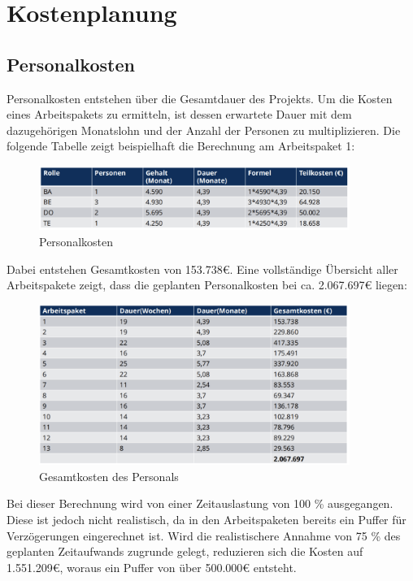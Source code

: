 \chapter{Kostenplanung}
\label{sec:kostenplanung}

\section{Personalkosten}
Personalkosten entstehen über die Gesamtdauer des Projekts. Um die Kosten eines Arbeitspakets zu ermitteln, ist dessen erwartete Dauer mit dem dazugehörigen Monatslohn und der Anzahl der Personen zu multiplizieren. Die folgende Tabelle zeigt beispielhaft die Berechnung am Arbeitspaket 1: 

\begin{figure}[ht]
	\centering
	\includegraphics[width=0.9\textwidth]{fig/Kosten1.png}
	\caption{Personalkosten}
	\label{fig:personalkosten}
\end{figure}

Dabei entstehen Gesamtkosten von 153.738€. Eine vollständige Übersicht aller Arbeitspakete zeigt, dass die geplanten Personalkosten bei ca. 2.067.697€ liegen:

\begin{figure}[ht]
	\centering
	\includegraphics[width=0.9\textwidth]{fig/Kosten2.png}
	\caption{Gesamtkosten des Personals}
	\label{fig:personalkosten_gesammt}
\end{figure}

Bei dieser Berechnung wird von einer Zeitauslastung von 100 \% ausgegangen. Diese ist jedoch nicht realistisch, da in den Arbeitspaketen bereits ein Puffer für Verzögerungen eingerechnet ist. Wird die realistischere Annahme von 75 \% des geplanten Zeitaufwands zugrunde gelegt, reduzieren sich die Kosten auf 1.551.209€, woraus ein Puffer von über 500.000€ entsteht. 

